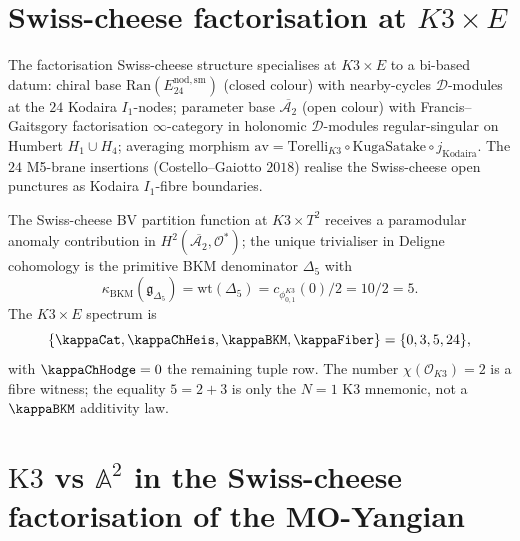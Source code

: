 \section{Swiss-cheese factorisation at \texorpdfstring{$K3 \times E$}{K3 times E}}
\label{sec:fsc-new}

\begin{remark}
\label{rem:fsc-K3xE-bi-based}
The factorisation Swiss-cheese structure specialises at $K3 \times E$ to a bi-based datum: chiral base $\mathrm{Ran}(E^{\mathrm{nod,sm}}_{24})$ (closed colour) with nearby-cycles $\mathcal{D}$-modules at the $24$ Kodaira $I_1$-nodes; parameter base $\overline{\mathcal{A}_2}$ (open colour) with Francis--Gaitsgory factorisation $\infty$-category in holonomic $\mathcal{D}$-modules regular-singular on Humbert $H_1 \cup H_4$; averaging morphism $\mathrm{av} = \mathrm{Torelli}_{K3} \circ \mathrm{KugaSatake} \circ j_{\mathrm{Kodaira}}$. The $24$ M5-brane insertions (Costello--Gaiotto $2018$) realise the Swiss-cheese open punctures as Kodaira $I_1$-fibre boundaries.
\end{remark}

\begin{remark}
\label{rem:fsc-delta5-1loop}
The Swiss-cheese BV partition function at $K3 \times T^2$ receives a
paramodular anomaly contribution in
$H^2(\overline{\mathcal{A}_2}, \mathcal{O}^*)$; the unique trivialiser
in Deligne cohomology is the primitive BKM denominator $\Delta_5$ with
\[
 \kappa_{\mathrm{BKM}}(\mathfrak g_{\Delta_5})
 =\mathrm{wt}(\Delta_5)
 =c_{\phi_{0,1}^{K3}}(0)/2
 =10/2=5 .
\]
The $K3 \times E$ spectrum is
\[
 \{\kappaCat,\kappaChHeis,
 \kappaBKM,\kappaFiber\}
 =\{0,3,5,24\},
\]
with $\kappaChHodge=0$ the remaining tuple row. The number
$\chi(\mathcal O_{K3})=2$ is a fibre witness; the equality
$5=2+3$ is only the $N=1$ K3 mnemonic, not a
$\kappaBKM$ additivity law.
\end{remark}

\section{\texorpdfstring{$\mathrm{K3}$}{K3} vs \texorpdfstring{$\mathbb A^2$}{A-squared} in the Swiss-cheese factorisation of the MO-Yangian}
\label{sec:fsc-K3-vs-A2}

